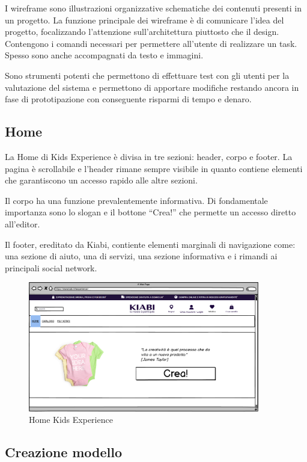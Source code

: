 \documentclass[12pt,italian,]{report}
\begin{document}
I wireframe sono illustrazioni organizzative schematiche dei contenuti
presenti in un progetto. La funzione principale dei wireframe è di
comunicare l'idea del progetto, focalizzando l'attenzione
sull'architettura piuttosto che il design. Contengono i comandi
necessari per permettere all'utente di realizzare un task. Spesso sono
anche accompagnati da testo e immagini. 

Sono strumenti potenti che
permettono di effettuare test con gli utenti per la valutazione del
sistema e permettono di apportare modifiche restando ancora in fase di
prototipazione con conseguente risparmi di tempo e denaro.

\subsection{Home}\label{home}

La Home di Kids Experience è divisa in tre sezioni: header, corpo e footer. La pagina è scrollabile e l'header rimane sempre visibile in quanto contiene elementi che garantiscono un accesso rapido alle altre sezioni.

Il corpo ha una funzione prevalentemente informativa. Di fondamentale importanza sono lo slogan e il bottone ``Crea!'' che permette un accesso diretto all'editor.

Il footer, ereditato da Kiabi, contiente elementi marginali di navigazione come: una sezione di aiuto, una di servizi, una sezione informativa e i rimandi ai principali social network.

\begin{figure}[h]
\centering
\includegraphics[width=0.9\textwidth]{../balsamiq/balsamiq_finale/HomeSottositoUtenteEsterno.png}
\caption{Home Kids Experience}
\end{figure}

\newpage
\subsection{Creazione modello}\label{creazione-modello}
\end{document}
